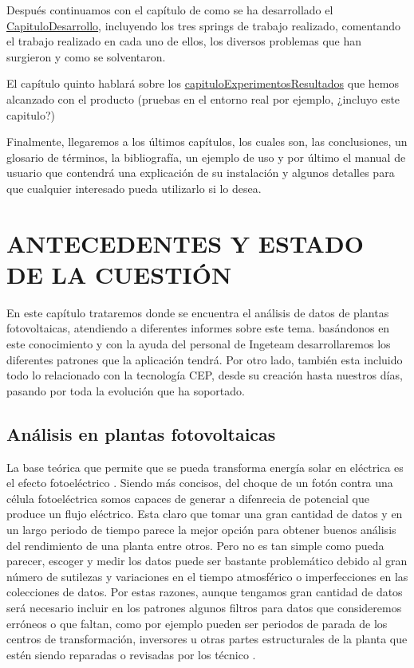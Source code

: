 \documentclass[spanish,twoside,openright,12pt,a4paper]{book}
\begin{document}
Después continuamos con el capítulo de como se ha desarrollado el \href{producto}{CapituloDesarrollo}, incluyendo los tres springs de trabajo realizado, comentando el trabajo realizado en cada uno de ellos, los diversos problemas que han surgieron y como se solventaron.

El capítulo quinto hablará sobre los \href{experimentos y resultados}{capituloExperimentosResultados} que hemos alcanzado con el producto (pruebas en el entorno real por ejemplo, ¿incluyo este capitulo?)

Finalmente, llegaremos a los últimos capítulos, los cuales son, las conclusiones, un glosario de términos, la bibliografía, un ejemplo de uso y por último el manual de usuario que contendrá una explicación de su instalación y algunos detalles para que cualquier interesado pueda utilizarlo si lo desea. 


  
\chapter{ANTECEDENTES Y ESTADO DE LA CUESTIÓN}
\label{capituloAnteEstado}
En este capítulo trataremos donde se encuentra el análisis de datos de plantas fotovoltaicas, atendiendo a diferentes informes sobre este tema. basándonos en este conocimiento y con la ayuda del personal de Ingeteam desarrollaremos los diferentes patrones que la aplicación tendrá. Por otro lado, también esta incluido todo lo relacionado con la tecnología CEP, desde su creación hasta nuestros días, pasando por toda la evolución que ha soportado.

\section{Análisis en plantas fotovoltaicas}
La base teórica que permite que se pueda transforma energía solar en eléctrica es el efecto fotoeléctrico \cite{young_freedman_ford_sears_undefined_2012}. Siendo más concisos, del choque de un fotón contra una célula fotoeléctrica somos capaces de generar a difenrecia de potencial que produce un flujo eléctrico.
Esta claro que tomar una gran cantidad de datos y en un largo periodo de tiempo parece la mejor opción para obtener buenos análisis del rendimiento de una planta entre otros. Pero no es tan simple como pueda parecer, escoger y medir los datos puede ser bastante problemático debido al gran número de sutilezas y variaciones en el tiempo atmosférico o imperfecciones en las colecciones de datos. Por estas razones, aunque tengamos gran cantidad de datos será necesario incluir en los patrones algunos filtros para datos que consideremos erróneos o que faltan, como por ejemplo pueden ser periodos de parada de los centros de transformación, inversores u otras partes estructurales de la planta que estén siendo reparadas o revisadas por los técnico \cite{osti_1111193}.
\end{document}
